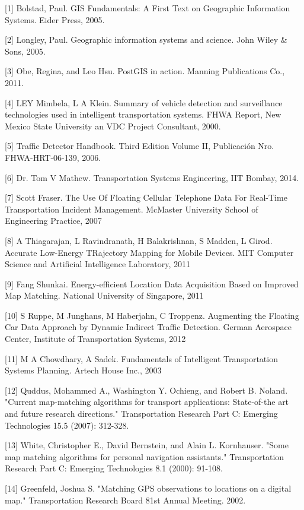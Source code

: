 \documentclass[final,fmstyle]{fpunathesis}
\begin{document}
[1] Bolstad, Paul. GIS Fundamentals: A First Text on Geographic Information Systems. Eider Press, 2005.

[2] Longley, Paul. Geographic information systems and science. John Wiley \& Sons, 2005.

[3] Obe, Regina, and Leo Hsu. PostGIS in action. Manning Publications Co., 2011.

[4] LEY Mimbela, L A Klein. Summary of vehicle detection and surveillance technologies used in intelligent transportation systems. FHWA Report, New Mexico State University an VDC Project Consultant, 2000.

[5] Traffic Detector Handbook. Third Edition Volume II, Publicación Nro. FHWA-HRT-06-139, 2006.

[6] Dr. Tom V Mathew. Transportation Systems Engineering, IIT Bombay, 2014.

[7] Scott Fraser. The Use Of Floating Cellular Telephone Data For Real-Time Transportation Incident Management. McMaster University School of Engineering Practice, 2007

[8] A Thiagarajan, L Ravindranath, H Balakrishnan, S Madden, L Girod. Accurate Low-Energy TRajectory Mapping for Mobile Devices. MIT Computer Science and Artificial Intelligence Laboratory, 2011

[9] Fang Shunkai. Energy-efficient Location Data Acquisition Based on Improved Map Matching. National University of Singapore, 2011

[10] S Ruppe, M Junghans, M Haberjahn, C Troppenz. Augmenting the Floating Car Data Approach by Dynamic Indirect Traffic Detection. German Aerospace Center, Institute of Transportation Systems, 2012

[11] M A Chowdhary, A Sadek. Fundamentals of Intelligent Transportation Systems Planning. Artech House Inc., 2003

[12] Quddus, Mohammed A., Washington Y. Ochieng, and Robert B. Noland. "Current map-matching algorithms for transport applications: State-of-the art and future research directions." Transportation Research Part C: Emerging Technologies 15.5 (2007): 312-328.

[13] White, Christopher E., David Bernstein, and Alain L. Kornhauser. "Some map matching algorithms for personal navigation assistants." Transportation Research Part C: Emerging Technologies 8.1 (2000): 91-108.

[14] Greenfeld, Joshua S. "Matching GPS observations to locations on a digital map." Transportation Research Board 81st Annual Meeting. 2002.
\end{document}
